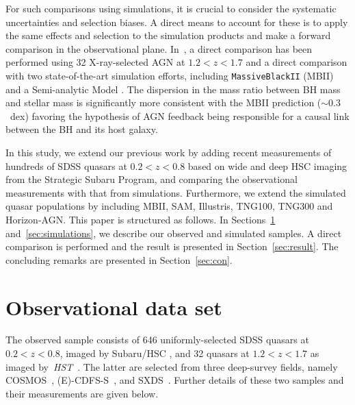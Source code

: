 \documentclass[twocolumn]{aastex631}
\def\hst{{\it HST}}
\begin{document}
For such comparisons using simulations, it is crucial to consider the systematic uncertainties and selection biases. A direct means to account for these is to apply the same effects and selection to the simulation products and make a forward comparison in the observational plane. In~\citet{Ding2020b}, a direct comparison has been performed using 32 X-ray-selected AGN at $1.2<z<1.7$ and a direct comparison with two state-of-the-art simulation efforts, including {\tt MassiveBlackII} (MBII) and a Semi-analytic Model \citep[SAM,][]{Menci2014, Menci2016}. The dispersion in the mass ratio between BH mass and stellar mass is significantly more consistent with the MBII prediction ($\sim0.3$~dex) favoring the hypothesis of AGN feedback being responsible for a causal link between the BH and its host galaxy.

In this study, we extend our previous work by adding recent measurements of hundreds of SDSS quasars at $0.2<z<0.8$ based on wide and deep HSC imaging from the Strategic Subaru Program, and comparing the observational measurements with that from simulations. Furthermore, we extend the simulated quasar populations by including MBII, SAM, Illustris, TNG100, TNG300 and Horizon-AGN. This paper is structured as follows. In Sections~\ref{sec:observations} and~\ref{sec:simulations}, we describe our observed and simulated samples. A direct comparison is performed and the result is presented in Section~\ref{sec:result}. The concluding remarks are presented in Section~\ref{sec:con}.

\section{Observational data set}
\label{sec:observations}
The observed sample consists of 646 uniformly-selected SDSS quasars at $0.2<z<0.8$, imaged by Subaru/HSC \citep{Li2021a}, and 32 quasars at $1.2<z<1.7$ as imaged by~\hst~\citep[][hereafter D20]{Ding2020}. The latter are selected from three deep-survey fields, namely COSMOS~\citep{Civano2016}, (E)-CDFS-S~\citep{Lehmer2005, Xue2011}, and SXDS~\citep{Ueda2008}. Further details of these two samples and their measurements are given below. 
\end{document}
